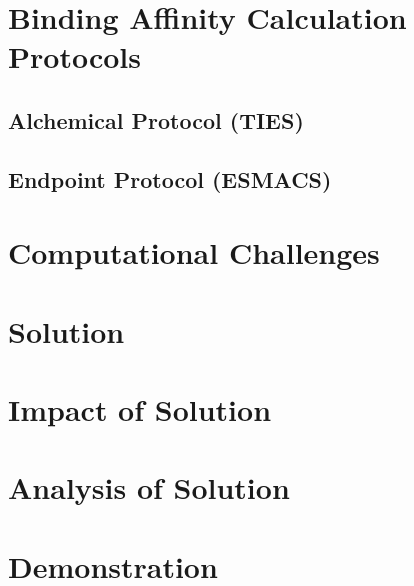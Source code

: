 \documentclass[conference]{IEEEtran}
\begin{document}

\section{Binding Affinity Calculation Protocols}\label{sec:bac}

\subsection{Alchemical Protocol (TIES)}\label{sec:ties}

\subsection{Endpoint Protocol (ESMACS)}\label{sec:esmacs}

\section{Computational Challenges}\label{sec:cc}

\section{Solution}\label{sec:solution}

\section{Impact of Solution}\label{sec:impact}

\section{Analysis of Solution}\label{sec:analysis}

\section{Demonstration}\label{sec:demo}




\end{document}

